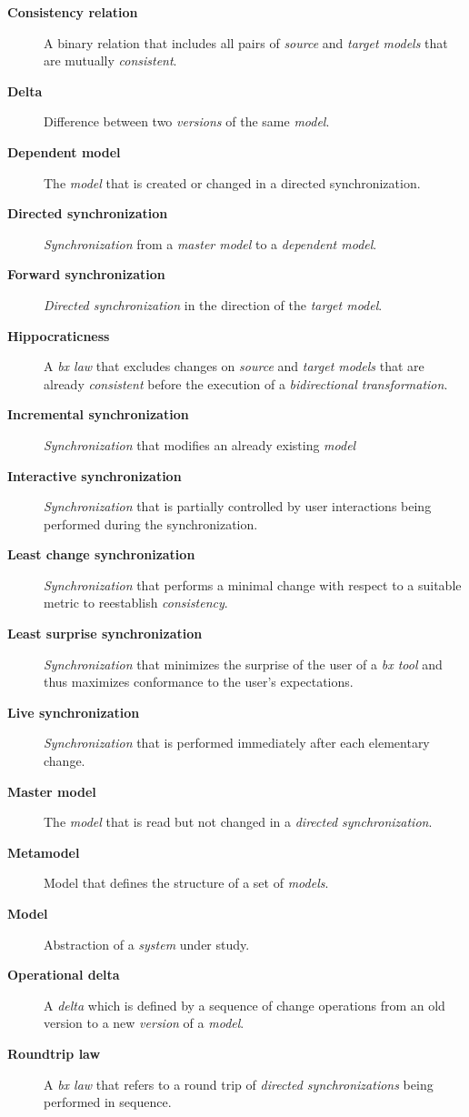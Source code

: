 \begin{description}
	\item[\textbf{Consistency relation}] A binary relation that includes all pairs of \emph{source} and \emph{target models} that are mutually \emph{consistent}.
	\item[\textbf{Delta}] Difference between two \emph{versions} of the same \emph{model}.
	\item[\textbf{Dependent model}] The \emph{model} that is created or changed in a directed synchronization.
	\item[\textbf{Directed synchronization}] \emph{Synchronization} from a \emph{master model} to a \emph{dependent model}.
	\item[\textbf{Forward synchronization}] \emph{Directed synchronization} in the direction of the \emph{target model}.
	\item[\textbf{Hippocraticness}] A \emph{bx law} that excludes changes on \emph{source} and \emph{target models} that are already \emph{consistent} before the execution of a \emph{bidirectional transformation}.
	\item[\textbf{Incremental synchronization}] \emph{Synchronization} that modifies an already existing \emph{model}
	\item[\textbf{Interactive synchronization}] \emph{Synchronization} that is partially controlled by user interactions being performed during the synchronization.
	\item[\textbf{Least change synchronization}] \emph{Synchronization} that performs a minimal change with respect to a suitable metric to reestablish \emph{consistency}.
	\item[\textbf{Least surprise synchronization}] \emph{Synchronization} that minimizes the surprise of the user of a \emph{bx tool} and thus maximizes conformance to the user's expectations.
	\item[\textbf{Live synchronization}] \emph{Synchronization} that is performed immediately after each elementary change. 
	\item[\textbf{Master model}] The \emph{model} that is read but not changed in a \emph{directed synchronization}.
	\item[\textbf{Metamodel}] Model that defines the structure of a set of \emph{models}.
	\item[\textbf{Model}] Abstraction of a \emph{system} under study.
	\item[\textbf{Operational delta}] A \emph{delta} which is defined by a sequence of change operations from an old version to a new \emph{version} of a \emph{model}.
	\item[\textbf{Roundtrip law}] A \emph{bx law} that refers to a round trip of \emph{directed synchronizations} being performed in sequence. 

\end{description}
